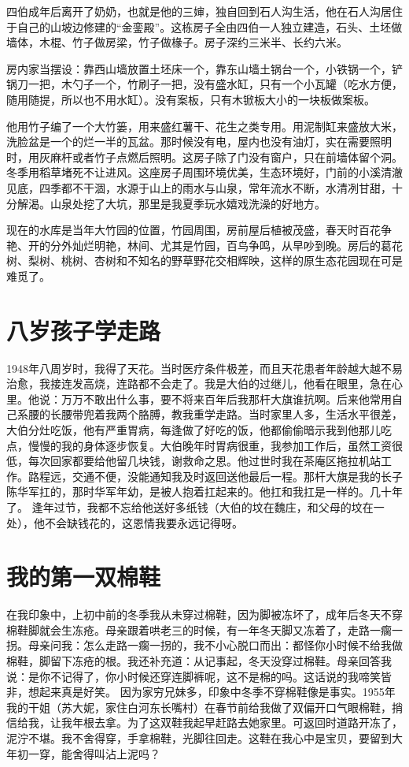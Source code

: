 四伯成年后离开了奶奶，也就是他的三婶，独自回到石人沟生活，他在石人沟居住于自己的山坡边修建的“金銮殿”。这栋房子全由四伯一人独立建造，石头、土坯做墙体，木棍、竹子做房梁，竹子做椽子。房子深约三米半、长约六米。

房内家当摆设：靠西山墙放置土坯床一个，靠东山墙土锅台一个，小铁锅一个，铲锅刀一把，木勺子一个，竹刷子一把，没有盛水缸，只有一个小瓦罐（吃水方便，随用随提，所以也不用水缸）。没有案板，只有木锨板大小的一块板做案板。

他用竹子编了一个大竹篓，用来盛红薯干、花生之类专用。用泥制缸来盛放大米，洗脸盆是一个的烂一半的瓦盆。那时候没有电，屋内也没有油灯，实在需要照明时，用灰麻杆或者竹子点燃后照明。这房子除了门没有窗户，只在前墙体留个洞。冬季用稻草堵死不让进风。这座房子周围环境优美，生态环境好，门前的小溪清澈见底，四季都不干涸，水源于山上的雨水与山泉，常年流水不断，水清冽甘甜，十分解渴。山泉处挖了大坑，那里是我夏季玩水嬉戏洗澡的好地方。

现在的水库是当年大竹园的位置，竹园周围，房前屋后植被茂盛，春天时百花争艳、开的分外灿烂明艳，林间、尤其是竹园，百鸟争鸣，从早吵到晚。房后的葛花树、梨树、桃树、杏树和不知名的野草野花交相辉映，这样的原生态花园现在可是难觅了。


\section*{八岁孩子学走路}

1948年八周岁时，我得了天花。当时医疗条件极差，而且天花患者年龄越大越不易治愈，我接连发高烧，连路都不会走了。我是大伯的过继儿，他看在眼里，急在心里。他说：万万不敢出什么事，要不将来百年后我那杆大旗谁抗啊。后来他常用自己系腰的长腰带兜着我两个胳膊，教我重学走路。当时家里人多，生活水平很差，大伯分灶吃饭，他有严重胃病，每逢做了好吃的饭，他都偷偷暗示我到他那儿吃点，慢慢的我的身体逐步恢复。大伯晚年时胃病很重，我参加工作后，虽然工资很低，每次回家都要给他留几块钱，谢救命之恩。他过世时我在茶庵区拖拉机站工作。路程远，交通不便，没能通知我及时返回送他最后一程。那杆大旗是我的长子陈华军扛的，那时华军年幼，是被人抱着扛起来的。他扛和我扛是一样的。几十年了。 逢年过节，我都不忘给他送好多纸钱（大伯的坟在魏庄，和父母的坟在一处），他不会缺钱花的，这恩情我要永远记得呀。


\section*{我的第一双棉鞋}

在我印象中，上初中前的冬季我从未穿过棉鞋，因为脚被冻坏了，成年后冬天不穿棉鞋脚就会生冻疮。母亲跟着哄老三的时候，有一年冬天脚又冻着了，走路一瘸一拐。母亲问我：怎么走路一瘸一拐的，我不小心脱口而出：都怪你小时候不给我做棉鞋，脚留下冻疮的根。我还补充道：从记事起，冬天没穿过棉鞋。母亲回答我说：是你不记得了，你小时候还穿连脚裤呢，这不是棉的吗。这话说的我啼笑皆非，想起来真是好笑。 因为家穷兄妹多，印象中冬季不穿棉鞋像是事实。1955年我的干姐（苏大妮，家住白河东长嘴村）在春节前给我做了双偏开口气眼棉鞋，捎信给我，让我年根去拿。为了这双鞋我起早赶路去她家里。可返回时道路开冻了，泥泞不堪。我不舍得穿，手拿棉鞋，光脚往回走。这鞋在我心中是宝贝，要留到大年初一穿，能舍得叫沾上泥吗？


